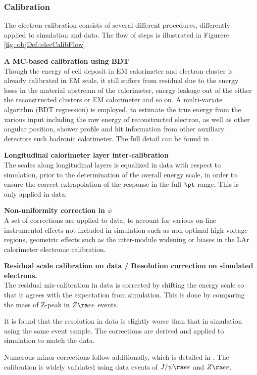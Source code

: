 \subsubsection{Calibration} \label{sec::objDef::electrons::calib}
The electron calibration consists of several different procedures, differently applied to simulation and data.
The flow of steps is illustrated in Figurere \ref{fig::objDef::elecCalibFlow}.

\begin{description}
\item \textbf{A MC-based calibration using BDT} \\
Though the energy of cell deposit in EM calorimeter and electron cluster is already calibrated in EM scale, 
it still suffers from residual due to the energy losss in the material upstream of the calorimeter, energy leakage out of the either the reconstructed clusters or EM calorimeter and so on.
A multi-variate algorithm (BDT regression) is employed, 
to estimate the true energy from the various input including the raw energy of reconstructed electron, as well as other angular position, shower profile and hit information from other auxiliary detectors such hadronic calorimeter.
The full detail can be found in \cite{161_egammaCalibRun1} \cite{egammaCalib2015}. 

\item \textbf{Longitudinal calorimeter layer inter-calibration} \\
The scales along longitudinal layers is equalized in data with respect to simulation, prior to the determination of the overall energy scale, in order to ensure the correct extrapolation of the response in the full $\pt$ range. This is only applied in data.

\item \textbf{Non-uniformity correction in $\phi$} \\
A set of corrections are applied to data, to account for various on-line instrumental effects not included in simulation such as non-optimal high voltage regions, geometric effects such as the inter-module widening or biases in the LAr calorimeter electronic calibration.

\item \textbf{Residual scale calibration on data / Resolution correction on simulated electrons.}  \\
The residual mis-calibration in data is corrected by shifting the energy scale so that it agrees with the expectation from simulation. This is done by comparing the mass of Z-peak in $Z \ra ee$ events.

It is found that the resolution in data is slightly worse than that in simulation using the same event sample.
The corrections are derived and applied to simulation to match the data. 
\end{description}
Numerous minor corrections follow additionally, which is detailed in \cite{161_egammaCalibRun1}. 
The calibration is widely validated using data events of $J/\psi \ra e e$ and $Z\ra ee$. \\

